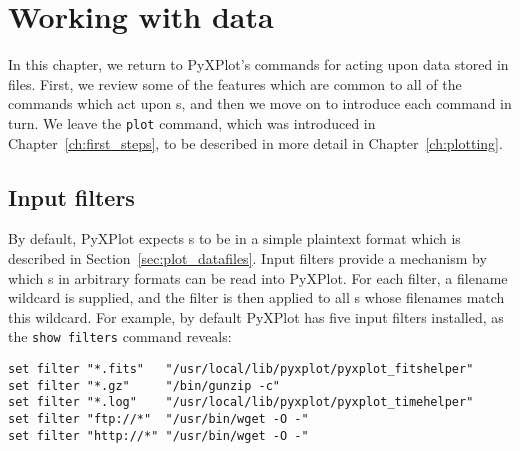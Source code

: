 %
%
%
%
%



\chapter{Working with data}
\label{ch:numerics}

In this chapter, we return to PyXPlot's commands for acting upon data stored in
files. First, we review some of the features which are common to all of the
commands which act upon \datafile s, and then we move on to introduce each
command in turn. We leave the {\tt plot} command, which was introduced in
Chapter~\ref{ch:first_steps}, to be described in more detail in
Chapter~\ref{ch:plotting}.

\section{Input filters}
\label{sec:filters}

By default, PyXPlot expects \datafile s to be in a simple plaintext format
which is described in Section~\ref{sec:plot_datafiles}. Input filters provide a
mechanism by which \datafile s in arbitrary formats can be read into PyXPlot.
For each filter, a filename wildcard is supplied, and the filter is then applied to
all \datafile s whose filenames match this wildcard. For example, by default
PyXPlot has five input filters installed, as the {\tt show filters} command
reveals:

\begin{verbatim}
set filter "*.fits"   "/usr/local/lib/pyxplot/pyxplot_fitshelper"
set filter "*.gz"     "/bin/gunzip -c"
set filter "*.log"    "/usr/local/lib/pyxplot/pyxplot_timehelper"
set filter "ftp://*"  "/usr/bin/wget -O -"
set filter "http://*" "/usr/bin/wget -O -"
\end{verbatim}

